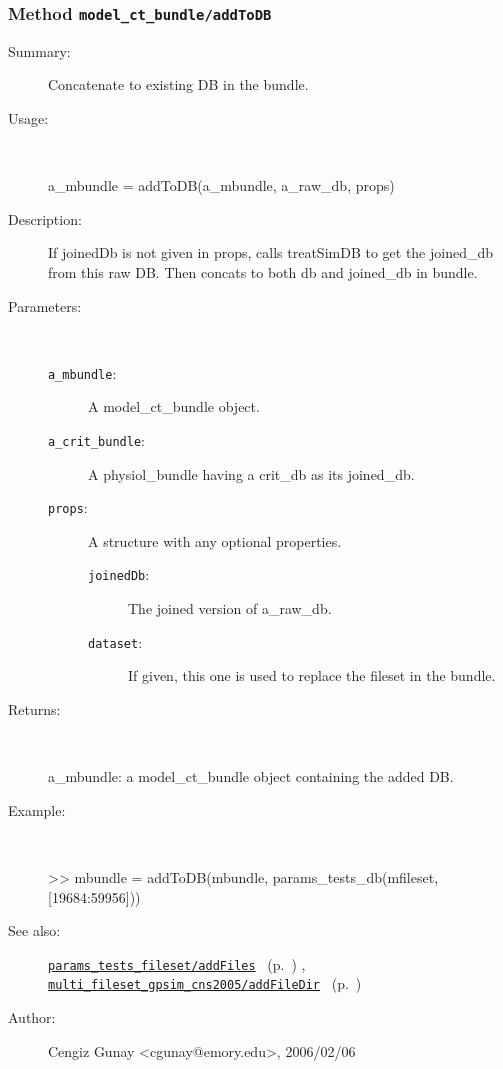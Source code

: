 \subsubsection[Method \texttt{addToDB}]{Method \texttt{model\_ct\_bundle/addToDB}}%
%
\label{ref_model_ct_bundle__addToDB}%
\hypertarget{ref_model_ct_bundle__addToDB}{}%
\begin{description}
\item[Summary:]Concatenate to existing DB in the bundle.
%
\item[Usage:]~%
\begin{lyxcode}%
a\_mbundle = addToDB(a\_mbundle, a\_raw\_db, props)
%
\end{lyxcode}%
%
\item[Description:]%
If joinedDb is not given in props, calls treatSimDB to get the joined\_db from this raw DB. 
 Then concats to both db and joined\_db in bundle.
\item[Parameters:]~
\begin{description}%
\item[\texttt{a\_mbundle}:]
 A model\_ct\_bundle object.
\item[\texttt{a\_crit\_bundle}:]
 A physiol\_bundle having a crit\_db as its joined\_db.
\item[\texttt{props}:]
 A structure with any optional properties.
\begin{description}%
\item[\texttt{joinedDb}:]
 The joined version of a\_raw\_db.
\item[\texttt{dataset}:]
 If given, this one is used to replace the fileset in the bundle.
\end{description}%
\end{description}%
%
\item[Returns:
]~

	a\_mbundle: a model\_ct\_bundle object containing the added DB.
%
\item[Example:]~
\begin{lyxcode} >> mbundle = addToDB(mbundle, params\_tests\_db(mfileset, [19684:59956]))
\\%
\end{lyxcode}
%
\item[See also:]%
\hyperlink{ref_params_tests_fileset__addFiles}{\texttt{params\_tests\_fileset/addFiles}}%
\ (p.~\pageref{ref_params_tests_fileset__addFiles})%
%
, \hyperlink{ref_multi_fileset_gpsim_cns2005__addFileDir}{\texttt{multi\_fileset\_gpsim\_cns2005/addFileDir}}%
\ (p.~\pageref{ref_multi_fileset_gpsim_cns2005__addFileDir})%
%
%
\item[Author:]%
Cengiz Gunay <cgunay@emory.edu>, 2006/02/06
%
\end{description}
\methodline%
